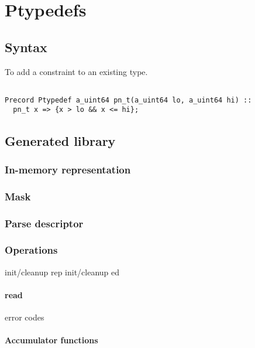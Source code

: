 \chapter{Ptypedefs}
\label{chap:typedefs}
\section{Syntax}
To add a constraint to an existing type.
\begin{verbatim}

Precord Ptypedef a_uint64 pn_t(a_uint64 lo, a_uint64 hi) :: 
  pn_t x => {x > lo && x <= hi};

\end{verbatim}


\section{Generated library}
\subsection{In-memory representation}
\label{sec:typedefs-rep}
\subsection{Mask}
\label{sec:typedefs-masks}
\subsection{Parse descriptor}
\label{sec:typedefs-parse-descriptors}
\subsection{Operations}
init/cleanup rep
init/cleanup ed
\subsubsection{read}
  error codes
\subsubsection{Accumulator functions}

